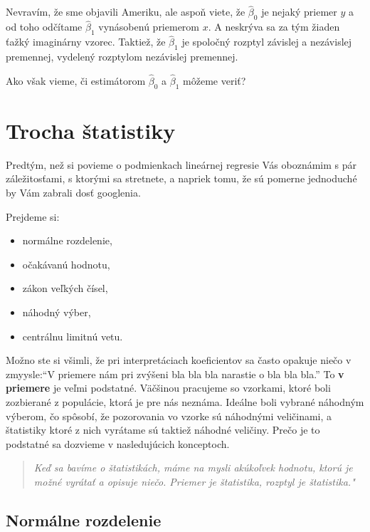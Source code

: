 Nevravím, že sme objavili Ameriku, ale aspoň viete, že \(\hat\beta_0\)
je nejaký priemer \(y\) a od toho odčítame \(\hat\beta_1\) vynásobenú
priemerom \(x\). A neskrýva sa za tým žiaden ťažký imaginárny vzorec.
Taktiež, že \(\hat\beta_1\) je spoločný rozptyl závislej a nezávislej
premennej, vydelený rozptylom nezávislej premennej.

Ako však vieme, či estimátorom \(\hat\beta_0\) a \(\hat\beta_1\) môžeme
veriť?

\newpage

\hypertarget{trocha-ux161tatistiky}{%
\section{Trocha štatistiky}\label{trocha-ux161tatistiky}}

Predtým, než si povieme o podmienkach lineárnej regresie Vás oboznámim s
pár záležitosťami, s ktorými sa stretnete, a napriek tomu, že sú pomerne
jednoduché by Vám zabrali dosť googlenia.

Prejdeme si:

\begin{itemize}
\tightlist
\item
  normálne rozdelenie,
\item
  očakávanú hodnotu,
\item
  zákon veľkých čísel,
\item
  náhodný výber,
\item
  centrálnu limitnú vetu.
\end{itemize}

Možno ste si všimli, že pri interpretáciach koeficientov sa často
opakuje niečo v zmyysle:``V priemere nám pri zvýšeni bla bla bla
narastie o bla bla bla.'' To \textbf{v priemere} je veľmi podstatné.
Väčšinou pracujeme so vzorkami, ktoré boli zozbierané z populácie, ktorá
je pre nás neznáma. Ideálne boli vybrané náhodným výberom, čo spôsobí,
že pozorovania vo vzorke sú náhodnými veličinami, a štatistiky ktoré z
nich vyrátame sú taktiež náhodné veličiny. Prečo je to podstatné sa
dozvieme v nasledujúcich konceptoch.

\begin{quote}
\emph{Keď sa bavíme o štatistikách, máme na mysli akúkoľvek hodnotu,
ktorú je možné vyrátať a opisuje niečo. Priemer je štatistika, rozptyl
je štatistika."}
\end{quote}

\hypertarget{normuxe1lne-rozdelenie}{%
\subsection{Normálne rozdelenie}\label{normuxe1lne-rozdelenie}}


